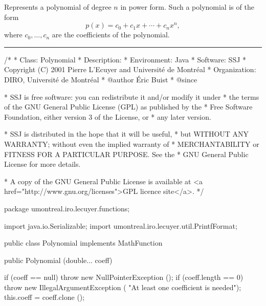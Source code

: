 
Represents a polynomial of degree $n$ in power form. Such a polynomial is of
the form
\begin{equation}
p(x) = c_0 + c_1x + \cdots + c_nx^n,
\end{equation}
where $c_0, \ldots, c_n$ are the coefficients of the polynomial.

\bigskip\hrule

\begin{code}
\begin{hide}
/*
 * Class:        Polynomial
 * Description:  
 * Environment:  Java
 * Software:     SSJ 
 * Copyright (C) 2001  Pierre L'Ecuyer and Université de Montréal
 * Organization: DIRO, Université de Montréal
 * @author       Éric Buist
 * @since

 * SSJ is free software: you can redistribute it and/or modify it under
 * the terms of the GNU General Public License (GPL) as published by the
 * Free Software Foundation, either version 3 of the License, or
 * any later version.

 * SSJ is distributed in the hope that it will be useful,
 * but WITHOUT ANY WARRANTY; without even the implied warranty of
 * MERCHANTABILITY or FITNESS FOR A PARTICULAR PURPOSE.  See the
 * GNU General Public License for more details.

 * A copy of the GNU General Public License is available at
   <a href="http://www.gnu.org/licenses">GPL licence site</a>.
 */
\end{hide}
package umontreal.iro.lecuyer.functions;\begin{hide}

import java.io.Serializable;
import umontreal.iro.lecuyer.util.PrintfFormat;
\end{hide}

public class Polynomial implements MathFunction\begin{hide}
,
      MathFunctionWithFirstDerivative, MathFunctionWithDerivative,
      MathFunctionWithIntegral, Serializable, Cloneable {
   private static final long serialVersionUID = -2911550952861456470L;
   private double[] coeff;
\end{hide}

   public Polynomial (double... coeff)\begin{hide} {
      if (coeff == null)
         throw new NullPointerException ();
      if (coeff.length == 0)
         throw new IllegalArgumentException (
               "At least one coefficient is needed");
      this.coeff = coeff.clone ();
   }\end{hide}
\end{code}
